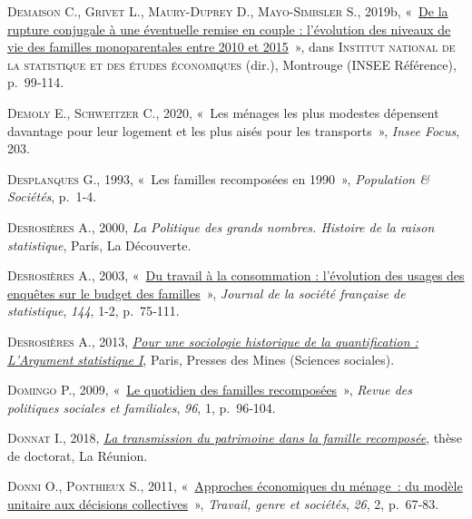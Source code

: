 \documentclass[
  12pt,
]{book}
\newlength{\cslhangindent}
\newenvironment{CSLReferences}[2] %
 {\begin{list}{}{%
  \setlength{\itemindent}{0pt}
  \setlength{\leftmargin}{0pt}
  \setlength{\parsep}{0pt}
  \ifodd #1
   \setlength{\leftmargin}{\cslhangindent}
   \setlength{\itemindent}{-1\cslhangindent}
  \fi
  \setlength{\itemsep}{#2\baselineskip}}}
 {\end{list}}
\begin{document}
\begin{CSLReferences}{0}{1}
\textsc{Demaison C.}, \textsc{Grivet L.}, \textsc{Maury-Duprey D.},
\textsc{Mayo-Simbsler S.}, 2019b,
{«~\href{https://www.insee.fr/fr/statistiques/4238781}{De la rupture
conjugale à une éventuelle remise en couple : l{'}évolution des niveaux
de vie des familles monoparentales entre 2010 et 2015}~»}, dans
\textsc{Institut national de la statistique et des études économiques}
(dir.), Montrouge (INSEE Référence), p.~99‑114.

\textsc{Demoly E.}, \textsc{Schweitzer C.}, 2020, {«~Les ménages les
plus modestes dépensent davantage pour leur logement et les plus aisés
pour les transports~»}, \emph{Insee Focus}, 203.

\textsc{Desplanques G.}, 1993, {«~Les familles recomposées en 1990~»},
\emph{Population \& Sociétés}, p.~1‑4.

\textsc{Desrosières A.}, 2000, \emph{La Politique des grands nombres.
Histoire de la raison statistique}, París, La Découverte.

\textsc{Desrosières A.}, 2003,
{«~\href{http://www.numdam.org/item/JSFS_2003__144_1-2_75_0/}{Du travail
à la consommation : l'évolution des usages des enquêtes sur le budget
des familles}~»}, \emph{Journal de la société française de statistique},
\emph{144}, 1-2, p.~75‑111.

\textsc{Desrosières A.}, 2013,
\emph{\href{http://books.openedition.org/pressesmines/901}{Pour une
sociologie historique de la quantification : L{'}Argument statistique
I}}, Paris, Presses des Mines (Sciences sociales).

\textsc{Domingo P.}, 2009,
{«~\href{https://doi.org/10.3406/caf.2009.2462}{Le quotidien des
familles recomposées}~»}, \emph{Revue des politiques sociales et
familiales}, \emph{96}, 1, p.~96‑104.

\textsc{Donnat I.}, 2018,
\emph{\href{http://www.theses.fr/2018LARE0021}{La transmission du
patrimoine dans la famille recomposée}}, thèse de doctorat, La Réunion.

\textsc{Donni O.}, \textsc{Ponthieux S.}, 2011,
{«~\href{https://doi.org/10.3917/tgs.026.0067}{Approches économiques du
ménage~: du modèle unitaire aux décisions collectives}~»},
\emph{Travail, genre et sociétés}, \emph{26}, 2, p.~67‑83.


\end{CSLReferences}
\end{document}
